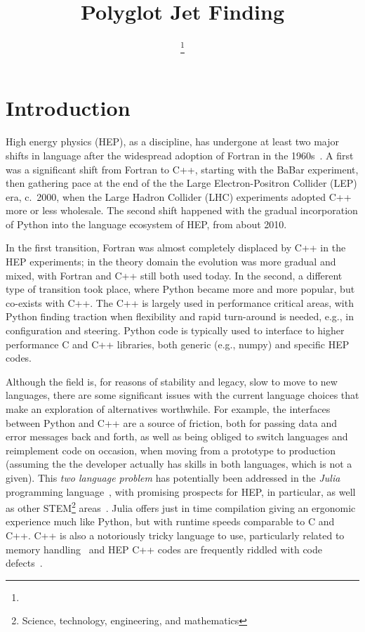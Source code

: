 \documentclass{webofc}
\title{Polyglot Jet Finding}
\author{\firstname{Graeme Andrew} \lastname{Stewart}\inst{1}\fnsep\thanks{\email{graeme.andrew.stewart@cern.ch}} \and
        \firstname{Philippe} \lastname{Gras}\inst{2}\fnsep \and
        \firstname{Benedikt} \lastname{Hegner}\inst{1}\fnsep \and
        \firstname{Atell} \lastname{Krasnopolski}\inst{3}
}
\institute{CERN, Esplanade des Particules 1, Geneva, Switzerland
\and
           IRFU, CEA, Université Paris-Saclay, Gif-sur-Yvette, France
\and
           Taras Shevchenko National University of Kyiv, Ukraine
          }
\begin{document}
\maketitle

\section{Introduction}
\label{sec:introduction}

High energy physics (HEP), as a discipline, has undergone at least two major
shifts in language after the widespread adoption of Fortran in the
1960s~\cite{pivarski2022}. A first was a significant shift from Fortran to C++,
starting with the BaBar experiment, then gathering pace at the end of the the
Large Electron-Positron Collider (LEP) era, c.\ 2000, when the Large Hadron
Collider (LHC) experiments adopted C++ more or less wholesale. The second shift
happened with the gradual incorporation of Python into the language ecosystem of
HEP, from about 2010.

In the first transition, Fortran was almost completely displaced by C++ in the
HEP experiments; in the theory domain the evolution was more gradual and mixed, with Fortran
and C++ still both used today. In the second, a different type of transition
took place, where Python became more and more popular, but co-exists with C++.
The C++ is largely used in performance critical areas, with Python finding
traction when flexibility and rapid turn-around is needed, e.g., in
configuration and steering. Python code is typically used to interface to higher
performance C and C++ libraries, both generic (e.g., numpy) and specific HEP
codes.

Although the field is, for reasons of stability and legacy, slow to move to new
languages, there are some significant issues with the current language choices
that make an exploration of alternatives worthwhile. For example, the interfaces
between Python and C++ are a source of friction, both for passing data and error
messages back and forth, as well as being obliged to switch languages and
reimplement code on occasion, when moving from a prototype to production
(assuming the the developer actually has skills in both languages, which is not
a given). This \emph{two language problem} has potentially been addressed in the
\emph{Julia} programming
language~\cite{bib:julia_freshapproach,10.1145/3276490}, with promising
prospects for HEP, in particular, \cite{Stanitzki:2020bnx,eschle2023potential}
as well as other STEM\footnote{Science, technology, engineering, and
mathematics} areas~\cite{perkel-julia-science}. Julia offers just in time
compilation giving an ergonomic experience much like Python, but with runtime
speeds comparable to C and C++. C++ is also a notoriously tricky language to
use, particularly related to memory handling~\cite{ms-security-2019} and HEP C++
codes are frequently riddled with code defects~\cite{Naumann_2014}.
\end{document}
